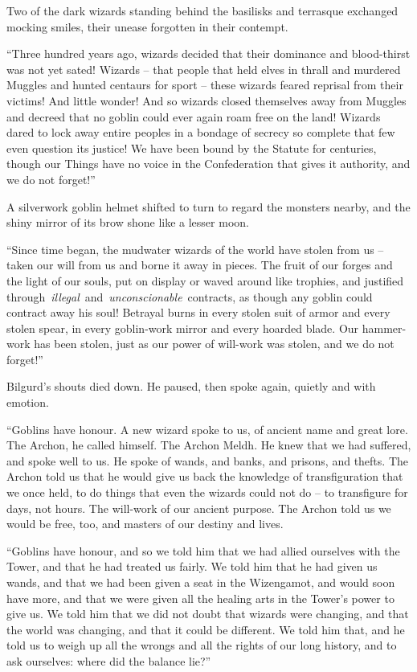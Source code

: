 Two of the dark wizards standing behind the basilisks and terrasque
exchanged mocking smiles, their unease forgotten in their contempt.

``Three hundred years ago, wizards decided that their dominance and
blood-thirst was not yet sated! Wizards -- that people that held elves
in thrall and murdered Muggles and hunted centaurs for sport -- these
wizards feared reprisal from their victims! And little wonder! And so
wizards closed themselves away from Muggles and decreed that no goblin
could ever again roam free on the land! Wizards dared to lock away
entire peoples in a bondage of secrecy so complete that few even
question its justice! We have been bound by the Statute for centuries,
though our Things have no voice in the Confederation that gives it
authority, and we do not forget!''

A silverwork goblin helmet shifted to turn to regard the monsters
nearby, and the shiny mirror of its brow shone like a lesser moon.

``Since time began, the mudwater wizards of the world have stolen from
us -- taken our will from us and borne it away in pieces. The fruit of
our forges and the light of our souls, put on display or waved around
like trophies, and justified
through~\emph{illegal}~and~\emph{unconscionable}~contracts, as though
any goblin could contract away his soul! Betrayal burns in every stolen
suit of armor and every stolen spear, in every goblin-work mirror and
every hoarded blade. Our hammer-work has been stolen, just as our power
of will-work was stolen, and we do not forget!''

Bilgurd's shouts died down. He paused, then spoke again, quietly and
with emotion.

``Goblins have honour. A new wizard spoke to us, of ancient name and
great lore. The Archon, he called himself. The Archon Meldh. He knew
that we had suffered, and spoke well to us. He spoke of wands, and
banks, and prisons, and thefts. The Archon told us that he would give us
back the knowledge of transfiguration that we once held, to do things
that even the wizards could not do -- to transfigure for days, not
hours. The will-work of our ancient purpose. The Archon told us we would
be free, too, and masters of our destiny and lives.

``Goblins have honour, and so we told him that we had allied ourselves
with the Tower, and that he had treated us fairly. We told him that he
had given us wands, and that we had been given a seat in the Wizengamot,
and would soon have more, and that we were given all the healing arts in
the Tower's power to give us. We told him that we did not doubt that
wizards were changing, and that the world was changing, and that it
could be different. We told him that, and he told us to weigh up all the
wrongs and all the rights of our long history, and to ask ourselves:
where did the balance lie?''


